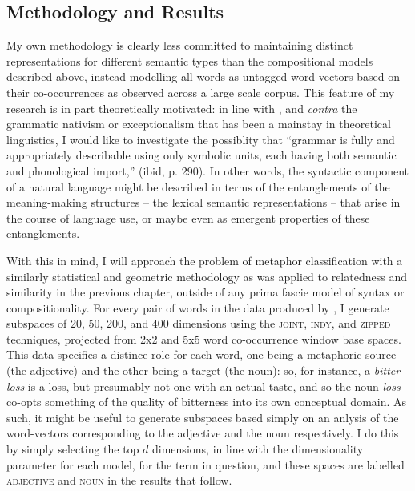 
\subsection{Methodology and Results} \label{sec:metameth}
My own methodology is clearly less committed to maintaining distinct representations for different semantic types than the compositional models described above, instead modelling all words as untagged word-vectors based on their co-occurrences as observed across a large scale corpus.  This feature of my research is in part theoretically motivated: in line with \cite{Langacker1991}, and \emph{contra} the grammatic nativism or exceptionalism that has been a mainstay in theoretical linguistics, I would like to investigate the possiblity that ``grammar is fully and appropriately describable using only symbolic units, each having both semantic and phonological import,'' (ibid, p. 290).  In other words, the syntactic component of a natural language might be described in terms of the entanglements of the meaning-making structures -- the lexical semantic representations -- that arise in the course of language use, or maybe even as emergent properties of these entanglements.

With this in mind, I will approach the problem of metaphor classification with a similarly statistical and geometric methodology as was applied to relatedness and similarity in the previous chapter, outside of any prima fascie model of syntax or compositionality.  For every pair of words in the data produced by \cite{GutierrezEA2016}, I generate subspaces of 20, 50, 200, and 400 dimensions using the \textsc{joint}, \textsc{indy}, and \textsc{zipped} techniques, projected from 2x2 and 5x5 word co-occurrence window base spaces.  This data specifies a distince role for each word, one being a metaphoric source (the adjective) and the other being a target (the noun): so, for instance, a \emph{bitter loss} is a loss, but presumably not one with an actual taste, and so the noun \emph{loss} co-opts something of the quality of bitterness into its own conceptual domain.
As such, it might be useful to generate subspaces based simply on an anlysis of the word-vectors corresponding to the adjective and the noun respectively.  I do this by simply selecting the top $d$ dimensions, in line with the dimensionality parameter for each model, for the term in question, and these spaces are labelled \textsc{adjective} and \textsc{noun} in the results that follow.


